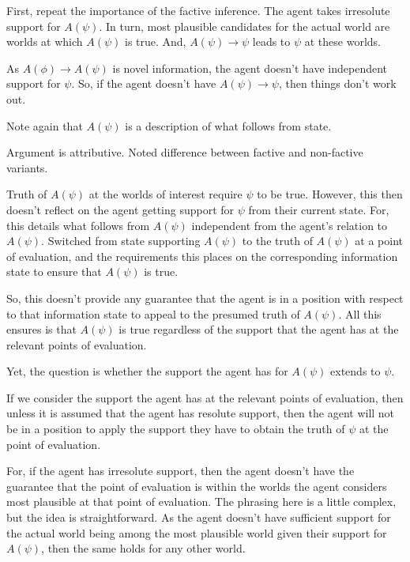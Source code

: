 \documentclass[10pt]{article}
\newcommand{\hozlinedash}[0]{%
  \noindent\hdashrule[0.5ex][c]{\textwidth}{.1pt}{2.5pt}
}
\begin{document}
\hozlinedash

\begin{note}
  First, repeat the importance of the factive inference.
  The agent takes irresolute support for \(A(\psi)\).
  In turn, most plausible candidates for the actual world are worlds at which \(A(\psi)\) is true.
  And, \(A(\psi) \rightarrow \psi\) leads to \(\psi\) at these worlds.

  As \(A(\phi) \rightarrow A(\psi)\) is novel information, the agent doesn't have independent support for \(\psi\).
  So, if the agent doesn't have \(A(\psi) \rightarrow \psi\), then things don't work out.

  Note again that \(A(\psi)\) is a description of what follows from state.

  Argument is attributive.
  Noted difference between factive and non-factive variants.

  Truth of \(A(\psi)\) at the worlds of interest require \(\psi\) to be true.
  However, this then doesn't reflect on the agent getting support for \(\psi\) from their current state.
  For, this details what follows from \(A(\psi)\) independent from the agent's relation to \(A(\psi)\).
  Switched from state supporting \(A(\psi)\) to the truth of \(A(\psi)\) at a point of evaluation, and the requirements this places on the corresponding information state to ensure that \(A(\psi)\) is true.

  So, this doesn't provide any guarantee that the agent is in a position with respect to that information state to appeal to the presumed truth of \(A(\psi)\).
  All this ensures is that \(A(\psi)\) is true regardless of the support that the agent has at the relevant points of evaluation.

  Yet, the question is whether the support the agent has for \(A(\psi)\) extends to \(\psi\).

  If we consider the support the agent has at the relevant points of evaluation, then unless it is assumed that the agent has resolute support, then the agent will not be in a position to apply the support they have to obtain the truth of \(\psi\) at the point of evaluation.

  For, if the agent has irresolute support, then the agent doesn't have the guarantee that the point of evaluation is within the worlds the agent considers most plausible at that point of evaluation.
  The phrasing here is a little complex, but the idea is straightforward.
  As the agent doesn't have sufficient support for the actual world being among the most plausible world given their support for \(A(\psi)\), then the same holds for any other world.


\end{note}
\end{document}

